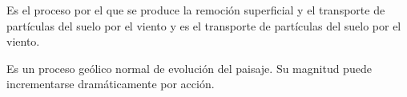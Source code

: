     \begin{definition}
        Es el proceso por el que se produce la remoción superficial y el transporte de partículas del suelo por el viento y es el transporte de partículas del suelo por el viento.
    \end{definition}
Es un proceso geólico normal de evolución del paisaje. Su magnitud puede incrementarse dramáticamente por acción.